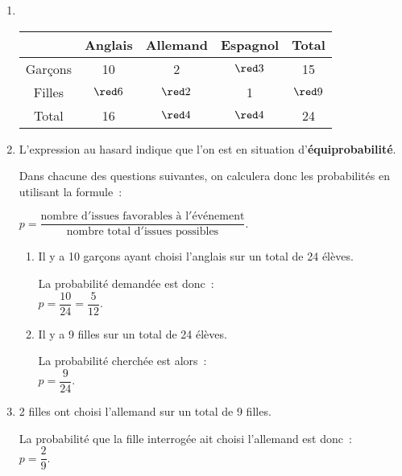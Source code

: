 \begin{corrige}
     \begin{enumerate}
          \item %
          ~\\
          \begin{center}
               \begin{tabular}{|c|c|c|c|c|} %
                    \hline
                    & Anglais & Allemand & Espagnol & Total \\
                    \hline
                    Garçons & 10 & 2 & $\red 3$   & 15 \\
                    \hline
                    Filles & $\red 6$   & $\red 2$   & 1 &  $\red 9$  \\
                    \hline
                    Total & 16  &  $\red 4$  & $\red 4$  &  24 \\
                    \hline
               \end{tabular}
          \end{center}
          \item %
          L'expression \og au hasard \fg{} indique que l'on est en situation d'\textbf{équiprobabilité}.
          \par
          Dans chacune des questions suivantes, on calculera donc les probabilités en utilisant la formule~:
          \begin{center}
               $p=\dfrac{\text{nombre d}'\text{issues favorables à l}'\text{événement}}{\text{nombre total d}'\text{issues possibles}}.$
          \end{center}
          \begin{enumerate}[label=\alph*.]
               \item %
               Il y a 10 garçons ayant choisi l'anglais sur un total de 24 élèves.
               \par
               La probabilité demandée est donc~:\\
               $p=\dfrac{10}{24}=\dfrac{5}{12}.$
               \item %
               Il y a 9 filles  sur un total de 24 élèves.
               \par
               La probabilité cherchée est alors~:\\
               $p=\dfrac{9}{24}.$
          \end{enumerate}
          \item %
          2 filles ont choisi l'allemand sur un total de 9 filles.
          \par
          La probabilité que la fille interrogée ait choisi l'allemand est donc~:\\
          $p=\dfrac{2}{9}.$
     \end{enumerate}
\end{corrige}
